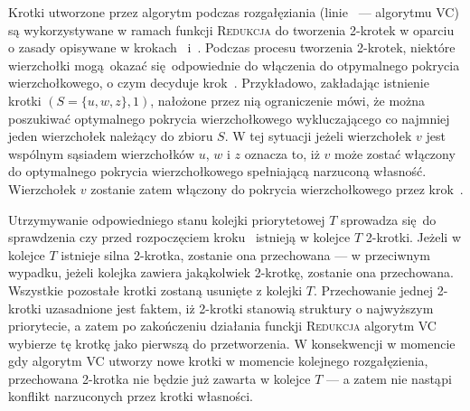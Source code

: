\par{
  Krotki utworzone przez algorytm podczas rozgałęziania (linie~ ---  algorytmu \textsc{VC}) są wykorzystywane w ramach funkcji \textsc{Redukcja} do tworzenia 2-krotek w oparciu o zasady opisywane w krokach~ i~.
  Podczas procesu tworzenia 2-krotek, niektóre wierzchołki mogą okazać się odpowiednie do włączenia do otpymalnego pokrycia wierzchołkowego, o czym decyduje krok~.
  Przykładowo, zakładając istnienie krotki $(S=\{u, w, z\}, 1)$, nałożone przez nią ograniczenie mówi, że można poszukiwać optymalnego pokrycia wierzchołkowego wykluczającego co najmniej jeden wierzchołek należący do zbioru $S$.
  W tej sytuacji jeżeli wierzchołek $v$ jest wspólnym sąsiadem wierzchołków $u$, $w$ i $z$ oznacza to, iż $v$ może zostać włączony do optymalnego pokrycia wierzchołkowego spełniającą narzuconą własność.
  Wierzchołek $v$ zostanie zatem włączony do pokrycia wierzchołkowego przez krok~.

  Utrzymywanie odpowiedniego stanu kolejki priorytetowej $T$ sprowadza się do sprawdzenia czy przed rozpoczęciem kroku~ istnieją w kolejce $T$ 2-krotki.
  Jeżeli w kolejce $T$ istnieje silna 2-krotka, zostanie ona przechowana --- w przeciwnym wypadku, jeżeli kolejka zawiera jakąkolwiek 2-krotkę, zostanie ona przechowana.
  Wszystkie pozostałe krotki zostaną usunięte z kolejki $T$.
  Przechowanie jednej 2-krotki uzasadnione jest faktem, iż 2-krotki stanowią struktury o najwyższym priorytecie, a zatem po zakończeniu działania funckji \textsc{Redukcja} algorytm \textsc{VC} wybierze tę krotkę jako pierwszą do przetworzenia.
  W konsekwencji w momencie gdy algorytm \textsc{VC} utworzy nowe krotki w momencie kolejnego rozgałęzienia, przechowana 2-krotka nie będzie już zawarta w kolejce $T$ --- a zatem nie nastąpi konflikt narzuconych przez krotki własności.
}
